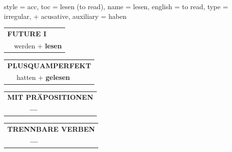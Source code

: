 \begin{verbentry}{
  style = {acc},
  toc = {lesen (to read)},
  name = {lesen},
  english = {to read},
  type = {irregular, + acusative},
  auxiliary = {haben}
}
\begin{tabular}{rl}
    \multicolumn{2}{l}{\textbf{FUTURE I} }\\
  &  werden + \textbf{lesen}\\
 
  \end{tabular}
\hfill
   \begin{tabular}{rl}
      \multicolumn{2}{l}{\textbf{PLUSQUAMPERFEKT}}\\
   & hatten + \textbf{gelesen}\\
  \end{tabular}
  
  
\vspace{10pt}

\begin{tabular}{lll}
\multicolumn{3}{l}{\textbf{MIT PRÄPOSITIONEN}}\\
& \textbf{---} & \\
\end{tabular}
\hfill
\begin{tabular}{lll}
\multicolumn{3}{l}{\textbf{TRENNBARE VERBEN}}\\
& \textbf{---} & \\
\end{tabular}
\vspace{-5pt}
\end{verbentry}


